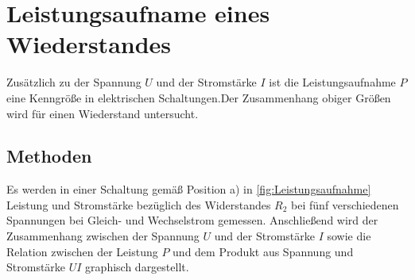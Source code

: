 



\section{Leistungsaufname eines Wiederstandes}

Zusätzlich zu der Spannung $U$ und der Stromstärke $I$ ist die Leistungsaufnahme $P$ eine Kenngröße in elektrischen Schaltungen.Der Zusammenhang obiger Größen wird für einen Wiederstand untersucht.



\subsection{Methoden}
Es werden in einer Schaltung gemäß Position a) in \cref{fig:Leistungsaufnahme} Leistung und Stromstärke bezüglich des Widerstandes $R_2$ bei fünf verschiedenen Spannungen bei Gleich- und Wechselstrom gemessen.
Anschließend wird der Zusammenhang zwischen der Spannung $U$ und der Stromstärke $I$ sowie die Relation zwischen der Leistung $P$ und dem Produkt aus Spannung und Stromstärke $UI$ graphisch dargestellt.








































